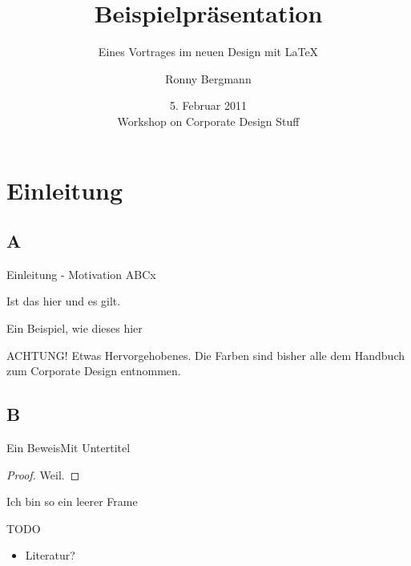 \documentclass[german,10pt,xcolor=colortbl,compress
]{beamer}
\title{Beispielpräsentation}
\subtitle{Eines Vortrages im neuen Design mit \LaTeX}
\date[]{5. Februar 2011\\[1ex] Workshop on Corporate Design Stuff}
\author[R. Bergmann]{Ronny Bergmann}
\institute[]{AG Bildverarbeitung\\FB Mathematik\\TU Kaiserslautern}
\begin{document}
	\maketitle	
	\section{Einleitung}
	\begin{frame}{}
		\tableofcontents
	\end{frame}
	\subsection{A}
	\begin{frame}{Einleitung - Motivation}
	ABCx
	\begin{lemma}
		Ist das hier und es gilt.
	\end{lemma}
	\begin{example}
		Ein Beispiel, wie dieses hier
	\end{example}
	\alert{ACHTUNG!}
		Etwas Hervorgehobenes. Die Farben sind bisher alle dem Handbuch zum Corporate Design entnommen.
	\end{frame}
	\subsection{B}
	\begin{frame}{Ein Beweis}{Mit Untertitel}
			\begin{proof}
				Weil.
			\end{proof}
	\end{frame}
	\begin{frame}[plain]{}{}%
		Ich bin so ein leerer Frame
	\end{frame}
	
	\begin{frame}{TODO}
		\begin{itemize}
			\item Literatur?
		\end{itemize}
	\end{frame}
\end{document}
